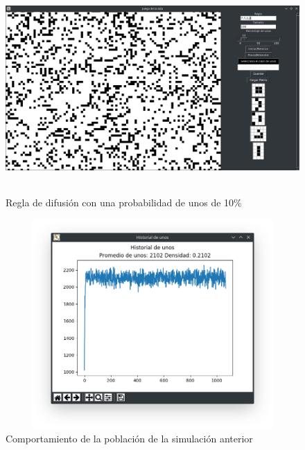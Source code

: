 \newpage

\begin{figure}[H]
\begin{center}
 \includegraphics[width=12cm, height=8cm]{./img/diffusion10.png}
 \caption{Regla de difusión con una probabilidad de unos de 10\%}
 \label{fig:diffusion10}
\end{center}
\end{figure}

\begin{figure}[H]
\begin{center}
 \includegraphics[width=12cm, height=8cm]{./img/diffusion10grafica.png}
 \caption{Comportamiento de la población de la simulación anterior}
 \label{fig:diffusion10grafica}
\end{center}
\end{figure}

